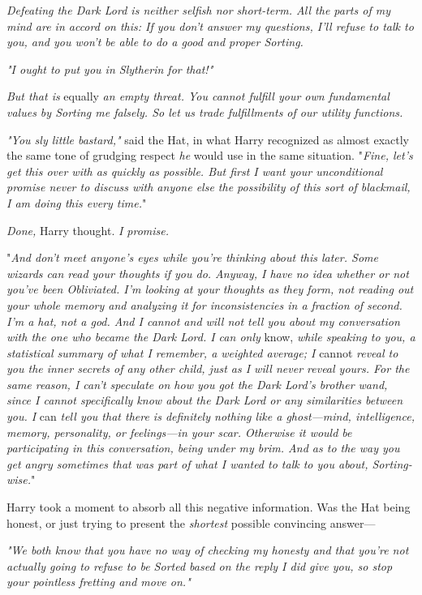 \emph{Defeating the Dark Lord is neither selfish nor short-term. All the parts
of my mind are in accord on this: If you don't answer my questions, I'll refuse
to talk to you, and you won't be able to do a good and proper Sorting.}

\emph{"I ought to put you in Slytherin for that!"}

\emph{But that is} equally \emph{an empty threat. You cannot fulfill your own
fundamental values by Sorting me falsely. So let us trade fulfillments of our
utility functions.}

\emph{"You sly little bastard,"} said the Hat, in what Harry recognized as
almost exactly the same tone of grudging respect \emph{he} would use in the
same situation. "\emph{Fine, let's get this over with as quickly as possible.
But first I want your unconditional promise never to discuss with anyone else
the possibility of this sort of blackmail, I am  doing this every time.}"

\emph{Done,} Harry thought. \emph{I promise.}

"\emph{And don't meet anyone's eyes while you're thinking about this later.
Some wizards can read your thoughts if you do. Anyway, I have no idea whether
or not you've been Obliviated. I'm looking at your thoughts as they form, not
reading out your whole memory and analyzing it for inconsistencies in a
fraction of second. I'm a hat, not a god. And I cannot and will not tell you
about my conversation with the one who became the Dark Lord. I can only}
know, \emph{while speaking to you, a statistical summary of what I remember, a
weighted average; I} cannot \emph{reveal to you the inner secrets of any other
child, just as I will never reveal yours. For the same reason, I can't
speculate on how you got the Dark Lord's brother wand, since I cannot
specifically know about the Dark Lord or any similarities between you. I}
can \emph{tell you that there is definitely nothing like a ghost---mind,
intelligence, memory, personality, or feelings---in your scar. Otherwise it
would be participating in this conversation, being under my brim. And as to the
way you get angry sometimes{\el} that was part of what I wanted to talk to
you about, Sorting-wise.}"

Harry took a moment to absorb all this negative information. Was the Hat being
honest, or just trying to present the \emph{shortest} possible convincing
answer---

\emph{"We both know that you have no way of checking my honesty and that you're
not actually going to refuse to be Sorted based on the reply I did give you, so
stop your pointless fretting and move on."}

